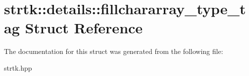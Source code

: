 \hypertarget{structstrtk_1_1details_1_1fillchararray__type__tag}{\section{strtk\-:\-:details\-:\-:fillchararray\-\_\-type\-\_\-tag Struct Reference}
\label{structstrtk_1_1details_1_1fillchararray__type__tag}
}


The documentation for this struct was generated from the following file\-:\begin{DoxyCompactItemize}
\item 
strtk.\-hpp\end{DoxyCompactItemize}
